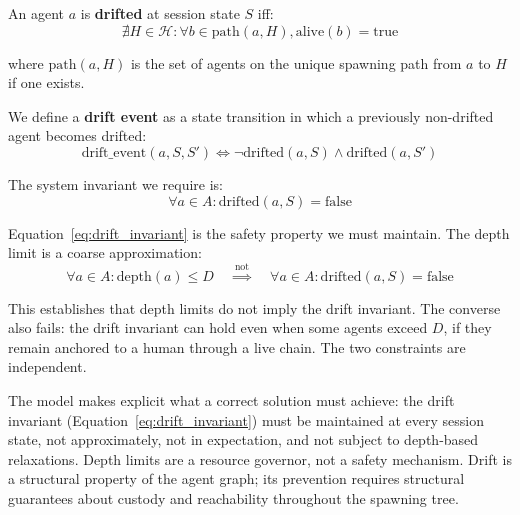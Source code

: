 An agent $a$ is \textbf{drifted} at session state $S$ iff:
\begin{equation}
\nexists H \in \mathcal{H}: \forall b \in \text{path}(a, H), \text{alive}(b) = \text{true}
\end{equation}

where $\text{path}(a, H)$ is the set of agents on the unique spawning path from $a$ to $H$ if one exists.

We define a \textbf{drift event} as a state transition in which a previously non-drifted agent becomes drifted:
\begin{equation}
\text{drift\_event}(a, S, S') \iff \neg \text{drifted}(a, S) \land \text{drifted}(a, S')
\end{equation}

The system invariant we require is:
\begin{equation}
\forall a \in A: \text{drifted}(a, S) = \text{false}
\label{eq:drift_invariant}
\end{equation}

Equation~\ref{eq:drift_invariant} is the safety property we must maintain. The depth limit is a coarse approximation:
\begin{equation}
\forall a \in A: \text{depth}(a) \leq D \quad \overset{\text{not}}{\implies} \quad \forall a \in A: \text{drifted}(a, S) = \text{false}
\end{equation}

This establishes that depth limits do not imply the drift invariant. The converse also fails: the drift invariant can hold even when some agents exceed $D$, if they remain anchored to a human through a live chain. The two constraints are independent.

The model makes explicit what a correct solution must achieve: the drift invariant (Equation~\ref{eq:drift_invariant}) must be maintained at every session state, not approximately, not in expectation, and not subject to depth-based relaxations. Depth limits are a resource governor, not a safety mechanism. Drift is a structural property of the agent graph; its prevention requires structural guarantees about custody and reachability throughout the spawning tree.

